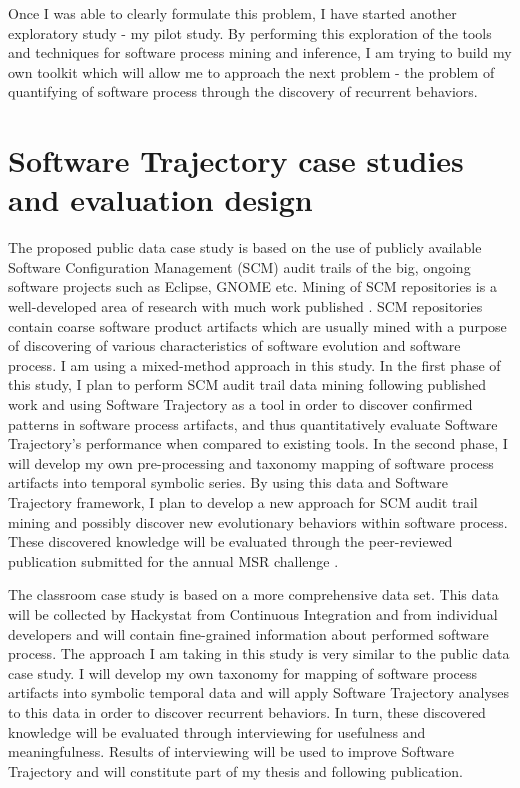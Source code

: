 Once I was able to clearly formulate this problem, I have started another exploratory study - my pilot study. By performing this exploration of the tools and techniques for software process mining and inference, I am trying to build my own toolkit which will allow me to approach the next problem - the problem of quantifying of software process through the discovery of recurrent behaviors. 

\section{Software Trajectory case studies and evaluation design}
The proposed public data case study is based on the use of publicly available Software Configuration Management (SCM) audit trails of the big, ongoing software projects such as Eclipse, GNOME etc. Mining of SCM repositories is a well-developed area of research with much work published \cite{citeulike:5043676}. SCM repositories contain coarse software product artifacts which are usually mined with a purpose of discovering of various characteristics of software evolution and software process. I am using a mixed-method approach in this study. In the first phase of this study, I plan to perform SCM audit trail data mining following published work and using Software Trajectory as a tool in order to discover confirmed patterns in software process artifacts, and thus quantitatively evaluate Software Trajectory's performance when compared to existing tools. In the second phase, I will develop my own pre-processing and taxonomy mapping of software process artifacts into temporal symbolic series. By using this data and Software Trajectory framework, I plan to develop a new approach for SCM audit trail mining and possibly discover new evolutionary behaviors within software process. These discovered knowledge will be evaluated through the peer-reviewed publication submitted for the annual MSR challenge \cite{citeulike:5043676}.

The classroom case study is based on a more comprehensive data set. This data will be collected by Hackystat from Continuous Integration and from individual developers and will contain fine-grained information about performed software process. The approach I am taking in this study is very similar to the public data case study. I will develop my own taxonomy for mapping of software process artifacts into symbolic temporal data and will apply Software Trajectory analyses to this data in order to discover recurrent behaviors. In turn, these discovered knowledge will be evaluated through interviewing for usefulness and meaningfulness. Results of interviewing will be used to improve Software Trajectory and will constitute part of my thesis and following publication.

